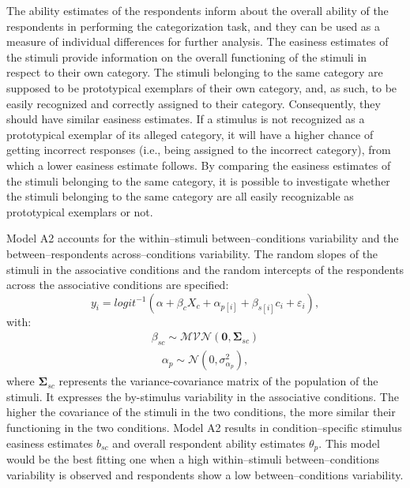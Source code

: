 \documentclass[12pt]{book}
\begin{document}
The ability estimates of the respondents inform about the overall ability of the respondents in performing the categorization task, and they can be used as a measure of individual differences for further analysis. 
The  easiness estimates of the stimuli provide information on the overall functioning of the stimuli in respect to their own category. The stimuli belonging to the same category are supposed to be prototypical exemplars of their own category, and, as such, to be easily recognized and correctly assigned to their category. Consequently, they should have similar easiness estimates.
If a stimulus is not recognized as a prototypical exemplar of its alleged category, it will have a higher chance of getting incorrect responses (i.e., being assigned to the incorrect category), from which a lower easiness estimate follows. By comparing the easiness estimates of the stimuli belonging to the same category, it is possible to investigate whether the stimuli belonging to the same category are all easily recognizable as prototypical exemplars or not.


Model A2 accounts for the within--stimuli between--conditions variability and the between--respondents across--conditions variability. The random slopes of the stimuli in the associative conditions and the random intercepts of the respondents across the associative conditions are specified:  
\begin{equation}\label{Accuracy2}
	y_{i} = logit^{-1}(\alpha + \beta_cX_c + \alpha_{p[i]} +  \beta_{s[i]}c_{i} + \varepsilon_{i}),
\end{equation}
with:
\begin{align}
	\beta_{sc} \sim \mathcal{MVN}(\bm{0}, \bm{\Sigma}_{sc})
\end{align}
\begin{align}
	\alpha_{p} \sim  \mathcal{N} (0, \sigma_{\alpha_p}^2), 
\end{align}
where $\bm{\Sigma}_{sc}$ represents the variance-covariance matrix of the population of the stimuli. It expresses the by-stimulus variability in the associative conditions. The higher the covariance of the stimuli in the two conditions, the more similar their functioning in the two conditions.
Model A2 results in condition--specific stimulus easiness estimates $b_{sc}$ and overall respondent ability estimates $\theta_{p}$.
This model would be the best fitting one when a high within--stimuli between--conditions variability is observed and respondents show a low between--conditions variability. 
\end{document}
